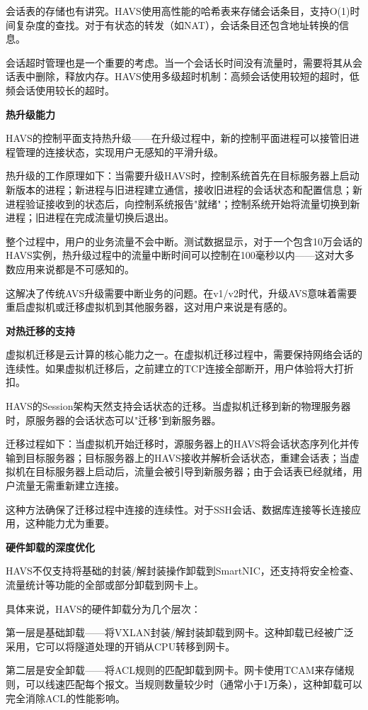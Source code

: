会话表的存储也有讲究。HAVS使用高性能的哈希表来存储会话条目，支持O(1)时间复杂度的查找。对于有状态的转发（如NAT），会话条目还包含地址转换的信息。

会话超时管理也是一个重要的考虑。当一个会话长时间没有流量时，需要将其从会话表中删除，释放内存。HAVS使用多级超时机制：高频会话使用较短的超时，低频会话使用较长的超时。

\textbf{热升级能力}

HAVS的控制平面支持热升级——在升级过程中，新的控制平面进程可以接管旧进程管理的连接状态，实现用户无感知的平滑升级。

热升级的工作原理如下：当需要升级HAVS时，控制系统首先在目标服务器上启动新版本的进程；新进程与旧进程建立通信，接收旧进程的会话状态和配置信息；新进程验证接收到的状态后，向控制系统报告"就绪"；控制系统开始将流量切换到新进程；旧进程在完成流量切换后退出。

整个过程中，用户的业务流量不会中断。测试数据显示，对于一个包含10万会话的HAVS实例，热升级过程中的流量中断时间可以控制在100毫秒以内——这对大多数应用来说都是不可感知的。

这解决了传统AVS升级需要中断业务的问题。在v1/v2时代，升级AVS意味着需要重启虚拟机或迁移虚拟机到其他服务器，这对用户来说是有感的。

\textbf{对热迁移的支持}

虚拟机迁移是云计算的核心能力之一。在虚拟机迁移过程中，需要保持网络会话的连续性。如果虚拟机迁移后，之前建立的TCP连接全部断开，用户体验将大打折扣。

HAVS的Session架构天然支持会话状态的迁移。当虚拟机迁移到新的物理服务器时，原服务器的会话状态可以"迁移"到新服务器。

迁移过程如下：当虚拟机开始迁移时，源服务器上的HAVS将会话状态序列化并传输到目标服务器；目标服务器上的HAVS接收并解析会话状态，重建会话表；当虚拟机在目标服务器上启动后，流量会被引导到新服务器；由于会话表已经就绪，用户流量无需重新建立连接。

这种方法确保了迁移过程中连接的连续性。对于SSH会话、数据库连接等长连接应用，这种能力尤为重要。

\textbf{硬件卸载的深度优化}

HAVS不仅支持将基础的封装/解封装操作卸载到SmartNIC，还支持将安全检查、流量统计等功能的全部或部分卸载到网卡上。

具体来说，HAVS的硬件卸载分为几个层次：

第一层是基础卸载——将VXLAN封装/解封装卸载到网卡。这种卸载已经被广泛采用，它可以将隧道处理的开销从CPU转移到网卡。

第二层是安全卸载——将ACL规则的匹配卸载到网卡。网卡使用TCAM来存储规则，可以线速匹配每个报文。当规则数量较少时（通常小于1万条），这种卸载可以完全消除ACL的性能影响。

